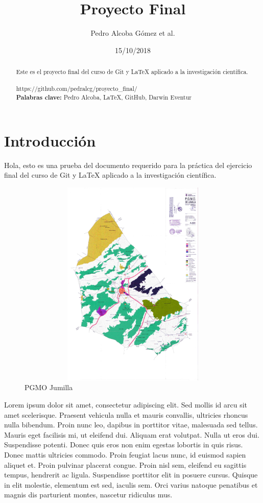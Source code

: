 \documentclass[a4paper,11pt]{article}
\begin{document}
\title{Proyecto Final}
\author{Pedro Alcoba Gómez et al.}
\date{15/10/2018}
\begin{abstract}
	Este es el proyecto final del curso de Git y \LaTeX{} aplicado a la investigación científica.
	\\\\
	https://github.com/pedralcg/proyecto\_final/
	\\
\textbf{Palabras clave:} Pedro Alcoba, \LaTeX{}, GitHub, Darwin Eventur  
\end{abstract}
\tableofcontents
\maketitle

\part{Introducción}
Hola, esto es una prueba del documento requerido para la práctica del ejercicio final del curso de Git y \LaTeX{} aplicado a la investigación científica.
\begin{figure}[h]
	\centering
		\includegraphics[width=150mm,height=100mm]{figura}
	\caption{PGMO Jumilla}
	\label{Figura}
\end{figure}

Lorem ipsum dolor sit amet, consectetur adipiscing elit. Sed mollis id arcu sit amet scelerisque. Praesent vehicula nulla et mauris convallis, ultricies rhoncus nulla bibendum. Proin nunc leo, dapibus in porttitor vitae, malesuada sed tellus. Mauris eget facilisis mi, ut eleifend dui. Aliquam erat volutpat. Nulla ut eros dui. Suspendisse potenti. Donec quis eros non enim egestas lobortis in quis risus. Donec mattis ultricies commodo. Proin feugiat lacus nunc, id euismod sapien aliquet et. Proin pulvinar placerat congue. Proin nisl sem, eleifend eu sagittis tempus, hendrerit ac ligula. Suspendisse porttitor elit in posuere cursus. Quisque in elit molestie, elementum est sed, iaculis sem. Orci varius natoque penatibus et magnis dis parturient montes, nascetur ridiculus mus.
\end{document}
